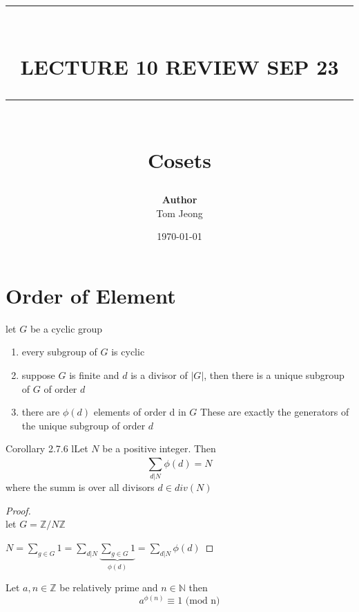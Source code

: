 \documentclass{article}
\newcommand{\HRule}[1]{\rule{\linewidth}{#1}}
\begin{document}

\title{ \normalsize \textsc{}
		\\ [2.0cm]
		\HRule{1.5pt} \\
		\LARGE \textbf{\uppercase{Lecture 10 REVIEW sep 23}}
		\HRule{2.0pt} \\ [0.6cm] \LARGE{Cosets}
		}

\date{\today}
\author{\textbf{Author} \\ 
		Tom Jeong
        }

\maketitle
\newpage

\tableofcontents
\newpage

\section{Order of Element}
\begin{proposition}
    let $G$ be a cyclic group 
    \begin{enumerate}
        \item every subgroup of $G$ is cyclic
        \item suppose $G$ is finite and $d$ is a divisor of $|G|$, then there is a unique subgroup of $G$ of order $d$
        \item there are $\phi(d)$ elements of order d in $G$ These are exactly the generators of the unique subgroup of order $d$
        
    \end{enumerate}
\end{proposition}


Corollary 2.7.6 
lLet $N$ be a positive integer. Then $$\sum_{d|N}^{}\phi(d) = N$$ where the summ is over all divisors $d \in div(N)$
\begin{proof}
    \leavevmode\\
    let $G = \mathbb{Z} / N\mathbb{Z}$ 

    $N = \sum_{g \in G}^{} 1 = \sum_{d|N}^{} \underbrace{\sum_{g \in G}^{} 1}_{\phi(d)} = \sum_{d|N}^{}\phi(d) $
\end{proof}

\begin{theorem}[EUler 1.7.2]
    Let $a, n \in \mathbb{Z} $ be relatively prime and $n \in \mathbb{N}$ then $$a^{\phi(n) } \equiv 1 \text{ (mod n)}$$
    
\end{theorem}
\end{document}
